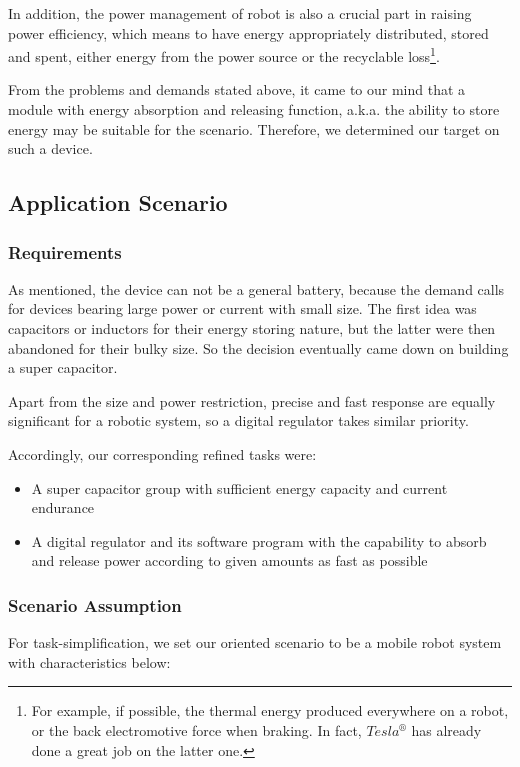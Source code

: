 \documentclass[a4paper,num-refs]{oup-contemporary}
\begin{document}
In addition, the power management of robot is also a crucial part in raising power efficiency, which means to have energy appropriately distributed, stored and spent, either energy from the power source or the recyclable loss\footnote{For example, if possible, the thermal energy produced everywhere on a robot, or the back electromotive force when braking. In fact, $ Tesla^{\circledR} $ has already done a great job on the latter one.}.

From the problems and demands stated above, it came to our mind that a module with energy absorption and releasing function, a.k.a. the ability to store energy may be suitable for the scenario. Therefore, we determined our target on such a device.

\subsection{Application Scenario}

\subsubsection{Requirements}
As mentioned, the device can not be a general battery, because the demand calls for devices bearing large power or current with small size. The first idea was capacitors or inductors for their energy storing nature, but the latter were then abandoned for their bulky size. So the decision eventually came down on building a super capacitor.

Apart from the size and power restriction, precise and fast response are equally significant for a robotic system, so a digital regulator takes similar priority.

Accordingly, our corresponding refined tasks were:
\begin{itemize}
	\item A super capacitor group with sufficient energy capacity and current endurance
	\item A digital regulator and its software program with the capability to absorb and release power according to given amounts as fast as possible
\end{itemize}

\subsubsection{Scenario Assumption}
For task-simplification, we set our oriented scenario to be a mobile robot system with characteristics below:
\end{document}
